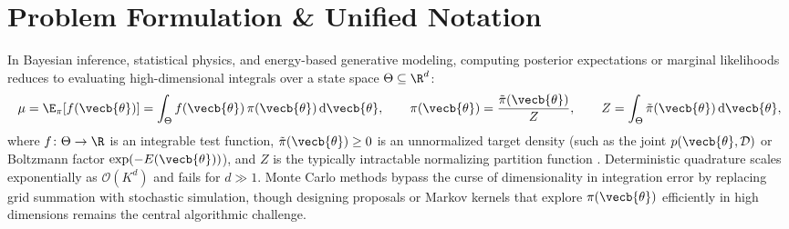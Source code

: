 \documentclass[../../../../master.tex]{subfiles}
\begin{document}

\section{Problem Formulation \& Unified Notation}
\label{sec:mcmc:formulation}

In Bayesian inference, statistical physics, and energy-based generative modeling, computing posterior expectations or marginal likelihoods reduces to evaluating high-dimensional integrals over a state space $\Theta \subseteq \R^d$:
\begin{equation}
  \label{eq:mcmc:target_expectation}
  \mu = \E_{\pi}[f(\vecb{\theta})] = \int_{\Theta} f(\vecb{\theta})\,\pi(\vecb{\theta})\,\mathrm{d}\vecb{\theta},
  \qquad
  \pi(\vecb{\theta}) = \frac{\tilde{\pi}(\vecb{\theta})}{Z},
  \qquad
  Z = \int_{\Theta} \tilde{\pi}(\vecb{\theta})\,\mathrm{d}\vecb{\theta},
\end{equation}
where $f \colon \Theta \to \R$ is an integrable test function, $\tilde{\pi}(\vecb{\theta}) \ge 0$ is an unnormalized target density (such as the joint $p(\vecb{\theta}, \mathcal{D})$ or Boltzmann factor $\exp(-E(\vecb{\theta}))$), and $Z$ is the typically intractable normalizing partition function  . Deterministic quadrature scales exponentially as $\mathcal{O}(K^d)$ and fails for $d \gg 1$. Monte Carlo methods bypass the curse of dimensionality in integration error by replacing grid summation with stochastic simulation, though designing proposals or Markov kernels that explore $\pi(\vecb{\theta})$ efficiently in high dimensions remains the central algorithmic challenge.
\end{document}
